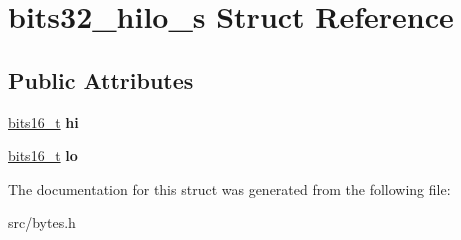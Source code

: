 \hypertarget{structbits32__hilo__s}{}\section{bits32\+\_\+hilo\+\_\+s Struct Reference}
\label{structbits32__hilo__s}
\subsection*{Public Attributes}
\begin{DoxyCompactItemize}
\item 
\hyperlink{unionbits16__s}{bits16\+\_\+t} {\bfseries hi}\hypertarget{structbits32__hilo__s_ada3e7b434275497de479184a4daf010b}{}\label{structbits32__hilo__s_ada3e7b434275497de479184a4daf010b}

\item 
\hyperlink{unionbits16__s}{bits16\+\_\+t} {\bfseries lo}\hypertarget{structbits32__hilo__s_a2aa55ad6da1c8e3692bfd378d0db89e8}{}\label{structbits32__hilo__s_a2aa55ad6da1c8e3692bfd378d0db89e8}

\end{DoxyCompactItemize}


The documentation for this struct was generated from the following file\+:\begin{DoxyCompactItemize}
\item 
src/bytes.\+h\end{DoxyCompactItemize}
